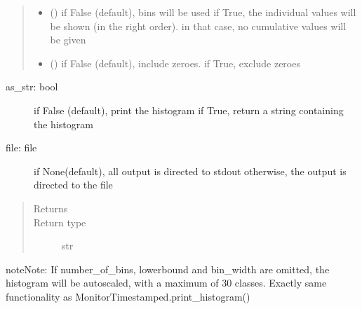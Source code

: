 \documentclass[letterpaper,10pt,english]{sphinxmanual}
\begin{document}
\begin{fulllineitems}
\begin{fulllineitems}
\begin{quote}
\begin{description}
\begin{itemize}
\item {} 
 () \textendash{} if False (default), bins will be used 
if True, the individual values will be shown (in the right order).
in that case, no cumulative values will be given 

\item {} 
 () \textendash{} if False (default), include zeroes. if True, exclude zeroes

\end{itemize}

\end{description}\end{quote}
\begin{description}
\item[{as\_str: bool}] \leavevmode
if False (default), print the histogram
if True, return a string containing the histogram

\item[{file: file}] \leavevmode
if None(default), all output is directed to stdout 
otherwise, the output is directed to the file

\end{description}
\begin{quote}\begin{description}
\item[{Returns}] \leavevmode
{}

\item[{Return type}] \leavevmode
str

\end{description}\end{quote}

\begin{sphinxadmonition}{note}{Note:}
If number\_of\_bins, lowerbound and bin\_width are omitted, the histogram will be autoscaled,
with a maximum of 30 classes. 
Exactly same functionality as MonitorTimestamped.print\_histogram()
\end{sphinxadmonition}

\end{fulllineitems}



\end{fulllineitems}
\end{document}
